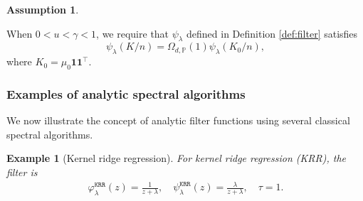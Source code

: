 \documentclass{article}
\theoremstyle{plain}
\newtheorem{example}{Example}
\theoremstyle{definition}
\newtheorem{assumption}{Assumption} %
\theoremstyle{remark}
\newcommand{\reg}{\varphi_\lambda}
\newcommand{\rem}{\psi_\lambda}
\newcommand*{\krr}{\mathtt{KRR}}
\newcommand{\green}{\color{green}}
\newcommand{\dhnote}[1]{{\color{red}[#1]} } %
\begin{document}
\begin{assumption}\label{assume_pert_filter}

When $0 < u < \gamma <1$, we require that $\rem$ defined in Definition \ref{def:filter} satisfies
$$
    \rem(K/n) = \Omega_{d, \mathbb{P}}(1)\rem(K_{0}/n), 
    $$
    where %
    $K_{0} = \mu_0 \mathbf{1} \mathbf{1}^{\top}$.
    

    
    

\end{assumption}

\subsubsection{Examples of analytic spectral algorithms}\label{subsec_example_spe}

We now illustrate the concept of analytic filter functions using several classical spectral algorithms.



\begin{example}[Kernel ridge regression]
  \label{example:KRR}
For kernel ridge regression (KRR), the filter is  
  \begin{align*}
    \reg^{\krr}(z) = \frac{1}{z+\lambda},\quad \rem^{\krr}(z) = \frac{\lambda}{z+\lambda},\quad \tau=1.
  \end{align*}
\end{example}
\end{document}
